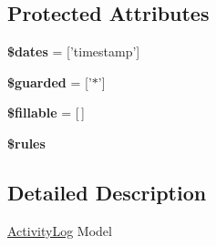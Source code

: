 \subsection*{Protected Attributes}
\begin{DoxyCompactItemize}
\item 
\hypertarget{classDMA_1_1Friends_1_1Models_1_1ActivityLog_a93009970cd65274bd1b7031986a53a52}{{\bfseries \$dates} = \mbox{[}'timestamp'\mbox{]}}\label{classDMA_1_1Friends_1_1Models_1_1ActivityLog_a93009970cd65274bd1b7031986a53a52}

\item 
\hypertarget{classDMA_1_1Friends_1_1Models_1_1ActivityLog_a1ee25a9d84f85dd39fbb9e5a5b005515}{{\bfseries \$guarded} = \mbox{[}'$\ast$'\mbox{]}}\label{classDMA_1_1Friends_1_1Models_1_1ActivityLog_a1ee25a9d84f85dd39fbb9e5a5b005515}

\item 
\hypertarget{classDMA_1_1Friends_1_1Models_1_1ActivityLog_ab42303e736f297bda15a97fd903b8d4d}{{\bfseries \$fillable} = \mbox{[}$\,$\mbox{]}}\label{classDMA_1_1Friends_1_1Models_1_1ActivityLog_ab42303e736f297bda15a97fd903b8d4d}

\item 
{\bfseries \$rules}
\end{DoxyCompactItemize}


\subsection{Detailed Description}
\hyperlink{classDMA_1_1Friends_1_1Models_1_1ActivityLog}{Activity\+Log} Model 

